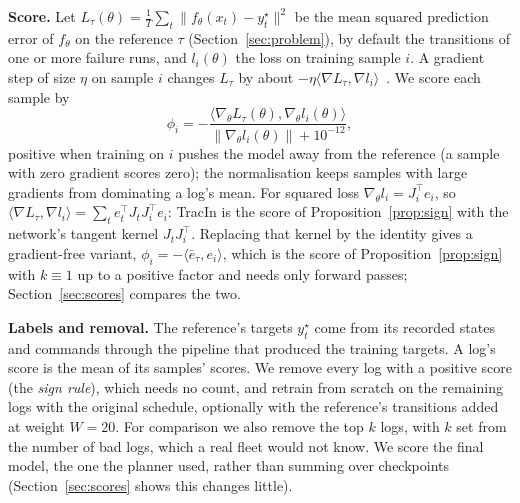 \documentclass[preprint,12pt]{elsarticle}
\begin{document}
\textbf{Score.} Let $L_\tau(\theta)=\frac1T\sum_{t}\|f_\theta(x_t)-y^\star_t\|^2$ be the mean squared prediction error of $f_\theta$ on the reference $\tau$ (Section~\ref{sec:problem}), by default the transitions of one or more failure runs, and $l_i(\theta)$ the loss on training sample $i$. A gradient step of size $\eta$ on sample $i$ changes $L_\tau$ by about $-\eta\langle\nabla L_\tau,\nabla l_i\rangle$~\citep{pruthi2020tracin}. We score each sample by
\begin{equation}\label{eq:score}
\phi_i=-\frac{\langle\nabla_\theta L_\tau(\theta),\nabla_\theta l_i(\theta)\rangle}{\|\nabla_\theta l_i(\theta)\|+10^{-12}},
\end{equation}
positive when training on $i$ pushes the model away from the reference (a sample with zero gradient scores zero); the normalisation keeps samples with large gradients from dominating a log's mean. For squared loss $\nabla_\theta l_i=J_i^\top e_i$, so $\langle\nabla L_\tau,\nabla l_i\rangle=\sum_t e_t^\top J_tJ_i^\top e_i$: TracIn is the score of Proposition~\ref{prop:sign} with the network's tangent kernel $J_tJ_i^\top$. Replacing that kernel by the identity gives a gradient-free variant, $\phi_i=-\langle\bar e_\tau,e_i\rangle$, which is the score of Proposition~\ref{prop:sign} with $k\equiv1$ up to a positive factor and needs only forward passes; Section~\ref{sec:scores} compares the two.

\textbf{Labels and removal.} The reference's targets $y^\star_t$ come from its recorded states and commands through the pipeline that produced the training targets. A log's score is the mean of its samples' scores. We remove every log with a positive score (the \emph{sign rule}), which needs no count, and retrain from scratch on the remaining logs with the original schedule, optionally with the reference's transitions added at weight $W=20$. For comparison we also remove the top $k$ logs, with $k$ set from the number of bad logs, which a real fleet would not know. We score the final model, the one the planner used, rather than summing over checkpoints (Section~\ref{sec:scores} shows this changes little).
\end{document}
